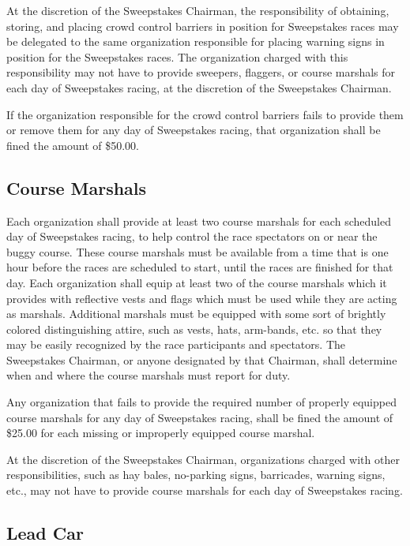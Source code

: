 	At the discretion of the Sweepstakes Chairman, the responsibility of obtaining,
	storing, and placing crowd control barriers in position for Sweepstakes races
	may be delegated to the same organization responsible for placing warning signs
	in position for the Sweepstakes races. The organization charged with this
	responsibility may not have to provide sweepers, flaggers, or course marshals
	for each day of Sweepstakes racing, at the discretion of the Sweepstakes
	Chairman.

	If the organization responsible for the crowd control barriers fails to provide
	them or remove them for any day of Sweepstakes racing, that organization shall
	be fined the amount of \$50.00.

\subsection{Course Marshals}

	Each organization shall provide at least two course marshals for each scheduled
	day of Sweepstakes racing, to help control the race spectators on or near the
	buggy course. These course marshals must be available from a time that is one
	hour before the races are scheduled to start, until the races are finished for
	that day. Each organization shall equip at least two of the course marshals
	which it provides with reflective vests and flags which must be used while they
	are acting as marshals. Additional marshals must be equipped with some sort of
	brightly colored distinguishing attire, such as vests, hats, arm-bands, etc. so
	that they may be easily recognized by the race participants and spectators. The
	Sweepstakes Chairman, or anyone designated by that Chairman, shall determine
	when and where the course marshals must report for duty.

	Any organization that fails to provide the required number of properly equipped
	course marshals for any day of Sweepstakes racing, shall be fined the amount of
	\$25.00 for each missing or improperly equipped course marshal.

	At the discretion of the Sweepstakes Chairman, organizations charged with other
	responsibilities, such as hay bales, no-parking signs, barricades, warning
	signs, etc., may not have to provide course marshals for each day of
	Sweepstakes racing.

\subsection{Lead Car}

